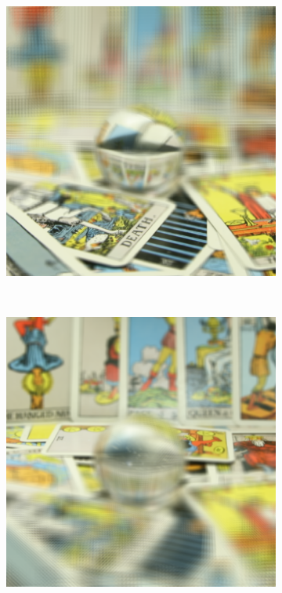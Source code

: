 \documentclass[11pt,a4paper,titlepage]{article}
\begin{document}
\begin{figure}
\begin{subfigure}[t]{0.19\textwidth}
	\end{subfigure}%
	~
	\begin{subfigure}[t]{0.19\textwidth}
		\includegraphics[width=\textwidth]{results/tarot_back_projection/sensorPlaneZ=-0.5/Back_Projection_layer_5.png} 
	\end{subfigure}%
	\\\quad
	\begin{subfigure}[t]{0.19\textwidth}
		\includegraphics[width=\textwidth]{results/tarot_back_projection/sensorPlaneZ=-3/Back_Projection_layer_1.png} 

\end{subfigure}
\end{figure}
\end{document}
